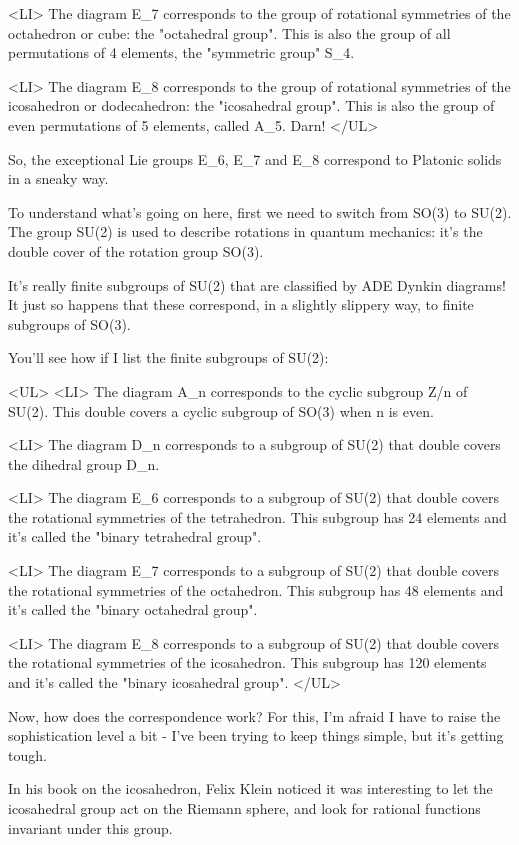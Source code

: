 <LI>
 The diagram E_{7} corresponds to the group of rotational symmetries
  of the octahedron or cube: the "octahedral group".  This is also 
  the group of all permutations of 4 elements, the "symmetric
  group" S_{4}.  

<LI>
 The diagram E_{8} corresponds to the group of rotational symmetries
  of the icosahedron or dodecahedron: the "icosahedral group".  This 
  is also the group of even permutations of 5 elements, called A_{5}.  
 Darn!
</UL>

So, the exceptional Lie groups E_{6}, E_{7} and E_{8} correspond to Platonic
solids in a sneaky way.  

To understand what's going on here, first we need to switch from SO(3)
to SU(2).  The group SU(2) is used to describe rotations in quantum 
mechanics: it's the double cover of the rotation group SO(3).  

It's really finite subgroups of SU(2) that are classified by ADE Dynkin 
diagrams!   It just so happens that these correspond, in a slightly
slippery way, to finite subgroups of SO(3).  

You'll see how if I list the finite subgroups of SU(2): 

<UL>
<LI>
 The diagram A_{n} corresponds to the cyclic subgroup Z/n of SU(2).
  This double covers a cyclic subgroup of SO(3) when n is even.

<LI>
 The diagram D_{n} corresponds to a subgroup of SU(2) that double 
  covers the dihedral group D_{n}.

<LI>
 The diagram E_{6} corresponds to a subgroup of SU(2) that double
  covers the rotational symmetries of the tetrahedron.  This
  subgroup has 24 elements and it's called the "binary tetrahedral group".

<LI>
 The diagram E_{7} corresponds to a subgroup of SU(2) that double
  covers the rotational symmetries of the octahedron.  This
  subgroup has 48 elements and it's called the "binary octahedral group".

<LI>
 The diagram E_{8} corresponds to a subgroup of SU(2) that double
  covers the rotational symmetries of the icosahedron.  This
  subgroup has 120 elements and it's called the "binary icosahedral group".
</UL>

Now, how does the correspondence work?  For this, I'm afraid I have to 
raise the sophistication level a bit - I've been trying to keep things
simple, but it's getting tough.  

In his book on the icosahedron, Felix Klein noticed it was interesting 
to let the icosahedral group act on the Riemann 
sphere, and look for rational functions invariant under this group.   

